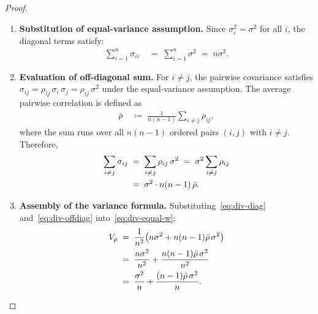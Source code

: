 \documentclass[12pt,openany]{book}
\numberwithin{equation}{chapter}
\theoremstyle{plain}
\theoremstyle{definition}
\theoremstyle{remark}
\begin{document}
\begin{proof}
\begin{enumerate}
  \item \textbf{Substitution of equal-variance assumption.}
        Since $\sigma_i^2 = \sigma^2$ for all $i$, the diagonal terms
        satisfy:
        \begin{align}
          \sum_{i=1}^{n}\sigma_{ii}
          &\;=\; \sum_{i=1}^{n}\sigma^2
          \;=\; n\sigma^2.
          \label{eq:div-diag}
        \end{align}

  \item \textbf{Evaluation of off-diagonal sum.}
        For $i \neq j$, the pairwise covariance satisfies
        $\sigma_{ij} = \rho_{ij}\,\sigma_i\,\sigma_j
                     = \rho_{ij}\,\sigma^2$
        under the equal-variance assumption.
        The average pairwise correlation is defined as
        \begin{align}
          \bar{\rho}
          &\;\coloneqq\; \frac{1}{n(n-1)}
            \sum_{i \neq j}\rho_{ij},
          \label{eq:rhobar-def}
        \end{align}
        where the sum runs over all $n(n-1)$ ordered pairs
        $(i,j)$ with $i \neq j$.  Therefore,
        \begin{align}
          \sum_{i \neq j}\sigma_{ij}
          &\;=\; \sum_{i \neq j}\rho_{ij}\,\sigma^2
          \;=\; \sigma^2 \sum_{i \neq j}\rho_{ij}
          \notag\\
          &\;=\; \sigma^2 \cdot n(n-1)\,\bar{\rho}.
          \label{eq:div-offdiag}
        \end{align}

  \item \textbf{Assembly of the variance formula.}
        Substituting~\eqref{eq:div-diag} and~\eqref{eq:div-offdiag}
        into~\eqref{eq:div-equal-w}:
        \begin{align}
          V_p
          &\;=\; \frac{1}{n^2}\bigl(n\sigma^2
                 + n(n-1)\bar{\rho}\,\sigma^2\bigr)
          \label{eq:div-proof1}\\
          &\;=\; \frac{n\sigma^2}{n^2}
                 + \frac{n(n-1)\bar{\rho}\,\sigma^2}{n^2}
          \notag\\
          &\;=\; \frac{\sigma^2}{n}
                 + \frac{(n-1)\bar{\rho}\,\sigma^2}{n}.
          \label{eq:div-proof2}
        \end{align}


\end{enumerate}
\end{proof}
\end{document}
